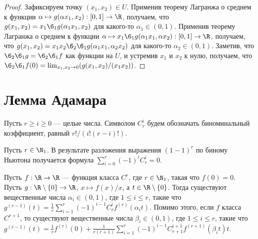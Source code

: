 \documentclass[
	extrafontsizes,
	11pt,
	hyphens,
]{memoir}
\begin{document}
\begin{proof}
Зафиксируем точку \((x_1,x_2) \in U\).
Применив теорему Лагранжа о среднем к функции \(\alpha \mapsto g(\alpha x_1, x_2) : [0,1] \to \R\),
получаем, что
\(g(x_1,x_2) = x_1 \6_1 g (\alpha_1 x_1, x_2)\)
для какого-то \(\alpha_1 \in (0,1)\).
Применив теорему Лагранжа о среднем к функции \(\alpha \mapsto x_1 \6_1 g (\alpha_1 x_1, \alpha x_2) : [0,1] \to \R\),
получаем, что
\(g(x_1,x_2) = x_1 x_2 \6_2 \6_1 g (\alpha_1 x_1, \alpha_2 x_2)\)
для какого-то \(\alpha_2 \in (0,1)\).
Заметив, что \(\6_2 \6_1 g = \6_2 \6_1 f\) как функции на \(U\), и
устремив \(x_1\) и \(x_2\) к нулю, получаем, что
\(
\6_2 \6_1 f (0) =
\lim_{x_1,x_2 \to 0} (g(x_1,x_2)/(x_1 x_2))
\).
\end{proof}

\section{Лемма Адамара}

\begin{notation}
Пусть \(r \geq i \geq 0\) --- целые числа. Символом \(C_r^i\) будем обозначать биноминальный коэффициент, равный \(r!/(i!(r-i)!)\).
\end{notation}

\begin{observation}
Пусть \(r \in \N_1\). В результате разложения выражения \((1-1)^r\) по биному Ньютона получается формула \(\sum_{i = 0}^r (-1)^i C_r^i = 0\).
\end{observation}

\begin{lemma}
\label{lem:ForHadamardLem}
Пусть \(f : \R \to \R\) --- функция класса \(C^r\), где \(r \in \N_1\), такая что \(f(0) = 0\).
Пусть \(g : \R \setminus \{0\} \to \R\), \(x \mapsto f(x)/x\), а
\(t \in \R \setminus \{0\}\).
Тогда существуют вещественные числа \(\alpha_i \in (0,1)\), где \(1 \leq i \leq r\),
такие что
\(
g^{(r-1)}(t) =
\frac{1}{r}
\sum_{i=1}^{r}
(-1)^{i-1}
C_r^i
f^{(r)}(\alpha_i t)
\).
Помимо этого, если \(f\) класса \(C^{r+1}\), то существуют вещественные числа \(\beta_i \in (0,1)\), где \(1 \leq i \leq r\),
такие что
\(
g^{(r-1)}(t) =
\frac{1}{r}
f^{(r)}(0) +
\frac{1}{r(r+1)}
\sum_{i=1}^{r}
(-1)^{i-1}
C_{r+1}^{i+1}
f^{(r+1)}(\beta_i t) t
\).
\end{lemma}
\end{document}
